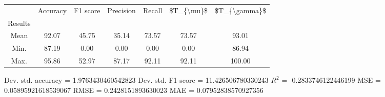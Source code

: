 \begin{tabular}{|c|c|c|c|c|c|c|}
\toprule
{} &  Accuracy &  F1 score &  Precision &  Recall &  \$T\_\{\textbackslash mu\}\$ &  \$T\_\{\textbackslash gamma\}\$ \\
Results &           &           &            &         &            &               \\
\hline
Mean    &     92.07 &     45.75 &      35.14 &   73.57 &      73.57 &         93.01 \\
Min.    &     87.19 &      0.00 &       0.00 &    0.00 &       0.00 &         86.94 \\
Max.    &     95.86 &     52.97 &      87.17 &   92.11 &      92.11 &        100.00 \\
\bottomrule
\end{tabular}

 Dev. std. accuracy = 1.9763430460542823
 Dev. std. F1-score = 11.426506780330243
 $R^2$ = -0.2833746122446199
 MSE = 0.05895921618539067
 RMSE = 0.2428151893630023
 MAE = 0.07952838570927356